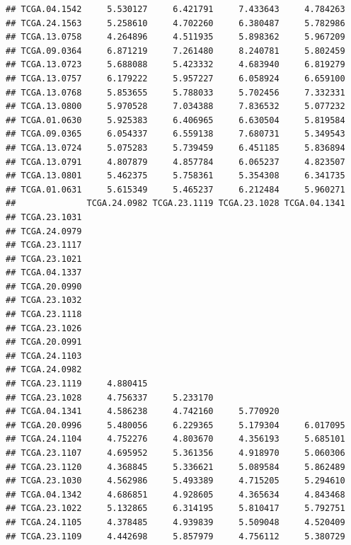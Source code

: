 \documentclass[UTF8]{beamer}\usepackage[]{graphicx}\usepackage[]{color}
\makeatletter
\newenvironment{kframe}{%
 \def\at@end@of@kframe{}%
 \ifinner\ifhmode%
  \def\at@end@of@kframe{\end{minipage}}%
  \begin{minipage}{\columnwidth}%
 \fi\fi%
 \def\FrameCommand##1{\hskip\@totalleftmargin \hskip-\fboxsep
 \colorbox{shadecolor}{##1}\hskip-\fboxsep
     \hskip-\linewidth \hskip-\@totalleftmargin \hskip\columnwidth}%
 \MakeFramed {\advance\hsize-\width
   \@totalleftmargin\z@ \linewidth\hsize
   \@setminipage}}%
 {\par\unskip\endMakeFramed%
 \at@end@of@kframe}
\newenvironment{knitrout}{}{} %
\makeatother
\begin{document}
\begin{frame}[fragile]
\begin{knitrout}
\begin{kframe}
\begin{verbatim}
## TCGA.04.1542     5.530127     6.421791     7.433643     4.784263
## TCGA.24.1563     5.258610     4.702260     6.380487     5.782986
## TCGA.13.0758     4.264896     4.511935     5.898362     5.967209
## TCGA.09.0364     6.871219     7.261480     8.240781     5.802459
## TCGA.13.0723     5.688088     5.423332     4.683940     6.819279
## TCGA.13.0757     6.179222     5.957227     6.058924     6.659100
## TCGA.13.0768     5.853655     5.788033     5.702456     7.332331
## TCGA.13.0800     5.970528     7.034388     7.836532     5.077232
## TCGA.01.0630     5.925383     6.406965     6.630504     5.819584
## TCGA.09.0365     6.054337     6.559138     7.680731     5.349543
## TCGA.13.0724     5.075283     5.739459     6.451185     5.836894
## TCGA.13.0791     4.807879     4.857784     6.065237     4.823507
## TCGA.13.0801     5.462375     5.758361     5.354308     6.341735
## TCGA.01.0631     5.615349     5.465237     6.212484     5.960271
##              TCGA.24.0982 TCGA.23.1119 TCGA.23.1028 TCGA.04.1341
## TCGA.23.1031                                                    
## TCGA.24.0979                                                    
## TCGA.23.1117                                                    
## TCGA.23.1021                                                    
## TCGA.04.1337                                                    
## TCGA.20.0990                                                    
## TCGA.23.1032                                                    
## TCGA.23.1118                                                    
## TCGA.23.1026                                                    
## TCGA.20.0991                                                    
## TCGA.24.1103                                                    
## TCGA.24.0982                                                    
## TCGA.23.1119     4.880415                                       
## TCGA.23.1028     4.756337     5.233170                          
## TCGA.04.1341     4.586238     4.742160     5.770920             
## TCGA.20.0996     5.480056     6.229365     5.179304     6.017095
## TCGA.24.1104     4.752276     4.803670     4.356193     5.685101
## TCGA.23.1107     4.695952     5.361356     4.918970     5.060306
## TCGA.23.1120     4.368845     5.336621     5.089584     5.862489
## TCGA.23.1030     4.562986     5.493389     4.715205     5.294610
## TCGA.04.1342     4.686851     4.928605     4.365634     4.843468
## TCGA.23.1022     5.132865     6.314195     5.810417     5.792751
## TCGA.24.1105     4.378485     4.939839     5.509048     4.520409
## TCGA.23.1109     4.442698     5.857979     4.756112     5.380729

\end{verbatim}
\end{kframe}
\end{knitrout}
\end{frame}
\end{document}
